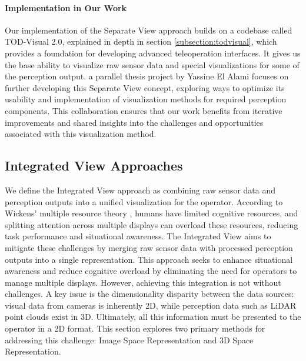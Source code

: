 \paragraph{Implementation in Our Work} Our implementation of the Separate View approach builds on a codebase called TOD-Visual 2.0, explained in depth in section \ref{subsection:todvisual}, which provides a foundation for developing advanced teleoperation interfaces.
It gives us the base ability to visualize raw sensor data and special visualizations for some of the perception output.
a parallel thesis project by Yassine El Alami \cite{yassinethesis} focuses on further developing this Separate View concept, exploring ways to optimize its usability and
implementation of visualization methods for required perception components. This collaboration ensures that our work benefits from iterative improvements and shared insights into the challenges and
opportunities associated with this visualization method.

\subsection{Integrated View Approaches}\label{section:integratedview}
We define the Integrated View approach as combining raw sensor data and perception outputs into a
unified visualization for the operator. According to Wickens' multiple resource theory \cite{wickens2008multiple},
humans have limited cognitive resources, and splitting attention across multiple displays can overload these resources,
reducing task performance and situational awareness. The Integrated View aims to mitigate these challenges by
merging raw sensor data with processed perception outputs into a single representation. This approach seeks to enhance
situational awareness and reduce cognitive overload by eliminating the need for operators to manage multiple displays.
However, achieving this integration is not without challenges. A key issue is the dimensionality disparity between the data sources:
visual data from cameras is inherently 2D, while perception data such as LiDAR point clouds exist in 3D.
Ultimately, all this information must be presented to the operator in a 2D format.
This section explores two primary methods for addressing this challenge:
Image Space Representation and 3D Space Representation.

